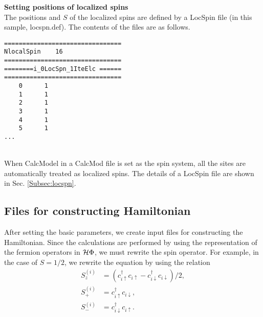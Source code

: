 \begin{description}
\item {\bf Setting positions of localized spins}\\
  The positions {and $S$} of the localized spins are defined by a LocSpin file
  (in this sample, locspn.def). The contents of the files are as follows.\\
\begin{minipage}{15cm}
\begin{screen}
\begin{verbatim}
================================ 
NlocalSpin    16  
================================ 
========i_0LocSpn_1IteElc ====== 
================================ 
    0      1
    1      1
    2      1
    3      1
    4      1
    5      1
...
\end{verbatim}
\end{screen}
\end{minipage}
~\\
When CalcModel in a CalcMod file is set as the spin system,
all the sites are automatically treated as localized spins.
The details of a LocSpin file are shown in Sec. \ref{Subsec:locspn}.
\end{description}

\subsection{Files for constructing Hamiltonian}
After setting the basic parameters, we create input files for constructing the Hamiltonian.
Since the calculations are performed by using the representation of the fermion operators in $\mathcal{H} \Phi$,
we must rewrite the spin operator.
For example,  in the case of $S=1/2$,
we rewrite the equation by using the relation
\begin{align}
S_z^{(i)}&=(c_{i\uparrow}^{\dag}c_{i\uparrow}-c_{i\downarrow}^{\dag}c_{i\downarrow})/2,\\
S_+^{(i)}&=c_{i\uparrow}^{\dag}c_{i\downarrow},\\
S_-^{(i)}&=c_{i\downarrow}^{\dag}c_{i\uparrow}.
\end{align}

